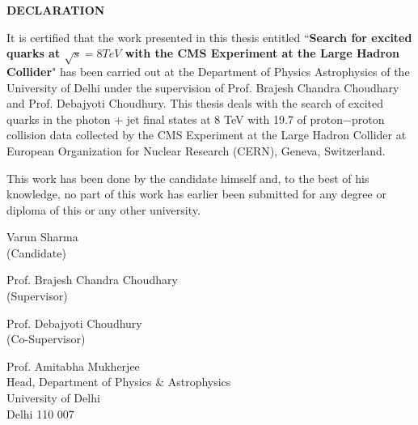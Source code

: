 \begin{center}
\doublespacing
{\Large \textbf{ DECLARATION}}
\vspace{0.8cm}
\end{center}
It is certified that the work presented in this thesis entitled ``{\bf Search for excited quarks at $\sqrt{s}=8\unit{TeV}$ with the CMS Experiment at the Large Hadron
Collider}" has been carried out at the Department of Physics \nd Astrophysics of the University of Delhi under the supervision of Prof. Brajesh Chandra Choudhary and 
Prof. Debajyoti Choudhury. This thesis deals with the search of excited quarks in the photon + jet final states at 8 TeV with 19.7 \fbinv of proton$-$proton collision
data collected by the CMS Experiment at the Large Hadron Collider at European Organization for Nuclear Research (CERN), Geneva, Switzerland.

This work has been done by the candidate himself and, to the best of his knowledge, no part of this work has earlier been submitted for any degree or diploma of this or any other university.
\vspace{0.4 in}	

\begin{flushright}
\doublespacing
Varun Sharma\\
(Candidate)\\
\end{flushright}


\begin{flushleft}
\doublespacing
Prof. Brajesh Chandra Choudhary\\
(Supervisor)\\
\end{flushleft}

\vspace{0.3 in}	

\begin{flushleft}
\doublespacing
Prof. Debajyoti Choudhury\\
(Co-Supervisor)\\
\end{flushleft}


\vspace{1 cm}	
\begin{center}
\doublespacing
{\large Prof. Amitabha Mukherjee}\\
{\large Head, Department of Physics \& Astrophysics}\\
{\large University of Delhi}\\
{\large Delhi 110 007}\\
\end{center}


